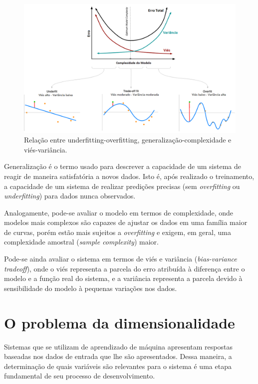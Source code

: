 \begin{figure}[H]
    \caption{Relação entre underfitting-overfitting, generalização-complexidade e viés-variância.}
    \begin{center}
    \includegraphics[width=\linewidth]{imgs/intro/over_underfitting}
    \end{center}
    \label{fig:over_underfitting}
\end{figure}

Generalização é o termo usado para descrever a capacidade de um sistema de reagir de maneira satisfatória a novos dados. Isto é, após realizado o treinamento, a capacidade de um sistema de realizar predições precisas (sem \textit{overfitting} ou \textit{underfitting}) para dados nunca observados.

Analogamente, pode-se avaliar o modelo em termos de complexidade, onde modelos mais complexos são capazes de ajustar os dados em uma família maior de curvas, porém estão mais sujeitos a \textit{overfitting} e exigem, em geral, uma complexidade amostral (\textit{sample complexity}) maior.

Pode-se ainda avaliar o sistema em termos de viés e variância (\textit{bias-variance tradeoff}), onde o viés representa a parcela do erro atribuída à diferença entre o modelo e a função real do sistema, e a variância representa a parcela devido à sensibilidade do modelo à pequenas variações nos dados.

\section{O problema da dimensionalidade}

Sistemas que se utilizam de aprendizado de máquina apresentam respostas baseadas nos dados de entrada que lhe são apresentados. Dessa maneira, a determinação de quais variáveis são relevantes para o sistema é uma etapa fundamental de seu processo de desenvolvimento.

